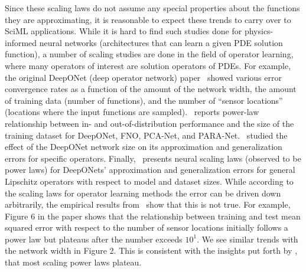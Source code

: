 Since these scaling laws do not assume any special properties about the functions they are approximating, it is reasonable to expect these trends to carry over to SciML applications. While it is hard to find such studies done for physics-informed neural networks (architectures that can learn a given PDE solution function), a number of scaling studies are done in the field of operator learning, where many operators of interest are solution operators of PDEs. For example, the original DeepONet (deep operator network) paper~\cite{lu2019deeponet} showed various error convergence rates as a function of the amount of the network width, the amount of training data (number of functions), and the number of ``sensor locations'' (locations where the input functions are sampled).~\cite{de2022cost} reports power-law relationship between in- and out-of-distribution performance and the size of the training dataset for DeepONet, FNO, PCA-Net, and PARA-Net.~\cite{lanthaler2022error} studied the effect of the DeepONet network size on its approximation and generalization errors for specific operators. Finally,~\cite{liu2024neural} presents neural scaling laws (observed to be power laws) for DeepONets' approximation and generalization errors for general Lipschitz operators with respect to model and dataset sizes. While according to the scaling laws for operator learning methods the error can be driven down arbitrarily, the empirical results from~\cite{lu2019deeponet} show that this is not true. For example, Figure 6 in the paper shows that the relationship between training and test mean squared error with respect to the number of sensor locations initially follows a power law but plateaus after the number exceeds $10^1$. We see similar trends with the network width in Figure 2. This is consistent with the insights put forth by \cite{kaplan2020scaling}, that most scaling power laws plateau.


